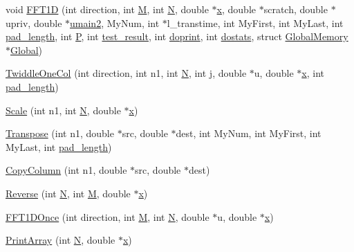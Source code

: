\begin{DoxyCompactItemize}
void \hyperlink{fft_8C_a251fc7139ef1899a1369849ff4b95c0d}{F\+F\+T1\+D} (int direction, int \hyperlink{fft_8C_a5e78dbd5fd0fc01ba7b98dd15e27221e}{M}, int \hyperlink{fft_8C_a7722c8ecbb62d99aee7ce68b1752f337}{N}, double $\ast$\hyperlink{fft_8C_a711aad4cbe735871dd9e91ab575c878b}{x}, double $\ast$scratch, double $\ast$upriv, double $\ast$\hyperlink{fft_8C_ab23232b0d8220f4be701c661c8e8aba7}{umain2}, My\+Num, int $\ast$l\+\_\+transtime, int My\+First, int My\+Last, int \hyperlink{fft_8C_a3d0e20892ce2302560522400f5b5da17}{pad\+\_\+length}, int \hyperlink{fft_8C_aef94be98e2c9e4a4dece75f60ca9792c}{P}, int \hyperlink{fft_8C_a6af31710995648af3fe9c60fbacfd9b0}{test\+\_\+result}, int \hyperlink{fft_8C_a62e849270b0e8c1e2378a94a87858e8b}{doprint}, int \hyperlink{fft_8C_a415f5ce7ea6e1d5f691e8c4d5b2a169f}{dostats}, struct \hyperlink{structGlobalMemory}{Global\+Memory} $\ast$\hyperlink{fft_8C_a6aa784faee19c1ec7661ca843bf221d7}{Global})
\item 
\hyperlink{fft_8C_ab346d9241b82dd3e9a10cee53e1672c5}{Twiddle\+One\+Col} (int direction, int n1, int \hyperlink{fft_8C_a7722c8ecbb62d99aee7ce68b1752f337}{N}, int j, double $\ast$u, double $\ast$\hyperlink{fft_8C_a711aad4cbe735871dd9e91ab575c878b}{x}, int \hyperlink{fft_8C_a3d0e20892ce2302560522400f5b5da17}{pad\+\_\+length})
\item 
\hyperlink{fft_8C_ac37f49e75f15ef2441f5debd361dda7b}{Scale} (int n1, int \hyperlink{fft_8C_a7722c8ecbb62d99aee7ce68b1752f337}{N}, double $\ast$\hyperlink{fft_8C_a711aad4cbe735871dd9e91ab575c878b}{x})
\item 
\hyperlink{fft_8C_aa3fe38d99c028158c9e6656e93e28be9}{Transpose} (int n1, double $\ast$src, double $\ast$dest, int My\+Num, int My\+First, int My\+Last, int \hyperlink{fft_8C_a3d0e20892ce2302560522400f5b5da17}{pad\+\_\+length})
\item 
\hyperlink{fft_8C_afb625e0cb8f22299b2e78c1f3d5662af}{Copy\+Column} (int n1, double $\ast$src, double $\ast$dest)
\item 
\hyperlink{fft_8C_a43a5d3f4a8e26803c9500a9eb70917d1}{Reverse} (int \hyperlink{fft_8C_a7722c8ecbb62d99aee7ce68b1752f337}{N}, int \hyperlink{fft_8C_a5e78dbd5fd0fc01ba7b98dd15e27221e}{M}, double $\ast$\hyperlink{fft_8C_a711aad4cbe735871dd9e91ab575c878b}{x})
\item 
\hyperlink{fft_8C_ab49452f62923f37ebe964d8657bb4bcc}{F\+F\+T1\+D\+Once} (int direction, int \hyperlink{fft_8C_a5e78dbd5fd0fc01ba7b98dd15e27221e}{M}, int \hyperlink{fft_8C_a7722c8ecbb62d99aee7ce68b1752f337}{N}, double $\ast$u, double $\ast$\hyperlink{fft_8C_a711aad4cbe735871dd9e91ab575c878b}{x})
\item 
\hyperlink{fft_8C_a4c95110b84f1e9f2b575122dbf1c1adc}{Print\+Array} (int \hyperlink{fft_8C_a7722c8ecbb62d99aee7ce68b1752f337}{N}, double $\ast$\hyperlink{fft_8C_a711aad4cbe735871dd9e91ab575c878b}{x})
\end{DoxyCompactItemize}
